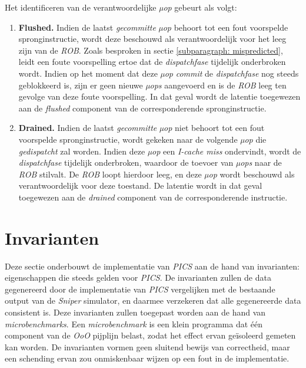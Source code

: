 \documentclass[12pt,a4paper,faculty=ea,language=nl]{ugent-doc}
\begin{document}
Het identificeren van de verantwoordelijke \textit{µop} gebeurt als volgt:

\begin{enumerate}
    \item{\textbf{Flushed.}} Indien de laatst \textit{gecommitte} \textit{µop} behoort tot een fout voorspelde spronginstructie, wordt deze beschouwd als verantwoordelijk voor het leeg zijn van de \textit{ROB}.
                            Zoals besproken in sectie \ref{subparagraph: mispredicted}, leidt een foute voorspelling ertoe dat de \textit{dispatchfase} tijdelijk onderbroken wordt.
                            Indien op het moment dat deze \textit{µop} \textit{commit} de \textit{dispatchfase} nog steeds geblokkeerd is, zijn er geen nieuwe \textit{µops} aangevoerd en is de \textit{ROB} leeg ten gevolge van deze foute voorspelling.
                            In dat geval wordt de latentie toegewezen aan de \textit{flushed} component van de corresponderende spronginstructie.
    \item{\textbf{Drained.}} Indien de laatst \textit{gecommitte} \textit{µop} niet behoort tot een fout voorspelde spronginstructie, wordt gekeken naar de volgende \textit{µop} die \textit{gedispatcht} zal worden.
                            Indien deze \textit{µop} een \textit{I-cache miss} ondervindt, wordt de \textit{dispatchfase} tijdelijk onderbroken, waardoor de toevoer van \textit{µops} naar de \textit{ROB} stilvalt.
                            De \textit{ROB} loopt hierdoor leeg, en deze \textit{µop} wordt beschouwd als verantwoordelijk voor deze toestand.
                            De latentie wordt in dat geval toegewezen aan de \textit{drained} component van de corresponderende instructie.
\end{enumerate}

\section{Invarianten}
\label{sectie:invarianten}
Deze sectie onderbouwt de implementatie van \textit{PICS} aan de hand van invarianten: eigenschappen die steeds gelden voor \textit{PICS}. De invarianten zullen de data gegenereerd door de implementatie van \textit{PICS} vergelijken met de bestaande output van de \textit{Sniper} simulator, en daarmee verzekeren dat alle gegenereerde data consistent is. Deze invarianten zullen toegepast worden aan de hand van \textit{microbenchmarks}. Een \textit{microbenchmark} is een klein programma dat één component van de \textit{OoO} pijplijn belast, zodat het effect ervan geïsoleerd gemeten kan worden. De invarianten vormen geen sluitend bewijs van correctheid, maar een schending ervan zou onmiskenbaar wijzen op een fout in de implementatie.
\end{document}
